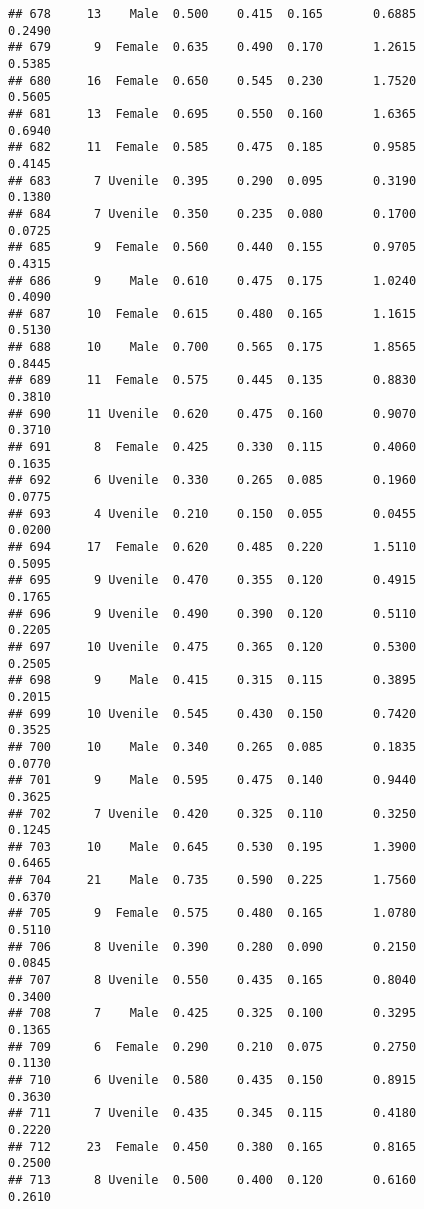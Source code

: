\documentclass[
]{article}
\begin{document}
\begin{verbatim}
## 678     13    Male  0.500    0.415  0.165       0.6885         0.2490
## 679      9  Female  0.635    0.490  0.170       1.2615         0.5385
## 680     16  Female  0.650    0.545  0.230       1.7520         0.5605
## 681     13  Female  0.695    0.550  0.160       1.6365         0.6940
## 682     11  Female  0.585    0.475  0.185       0.9585         0.4145
## 683      7 Uvenile  0.395    0.290  0.095       0.3190         0.1380
## 684      7 Uvenile  0.350    0.235  0.080       0.1700         0.0725
## 685      9  Female  0.560    0.440  0.155       0.9705         0.4315
## 686      9    Male  0.610    0.475  0.175       1.0240         0.4090
## 687     10  Female  0.615    0.480  0.165       1.1615         0.5130
## 688     10    Male  0.700    0.565  0.175       1.8565         0.8445
## 689     11  Female  0.575    0.445  0.135       0.8830         0.3810
## 690     11 Uvenile  0.620    0.475  0.160       0.9070         0.3710
## 691      8  Female  0.425    0.330  0.115       0.4060         0.1635
## 692      6 Uvenile  0.330    0.265  0.085       0.1960         0.0775
## 693      4 Uvenile  0.210    0.150  0.055       0.0455         0.0200
## 694     17  Female  0.620    0.485  0.220       1.5110         0.5095
## 695      9 Uvenile  0.470    0.355  0.120       0.4915         0.1765
## 696      9 Uvenile  0.490    0.390  0.120       0.5110         0.2205
## 697     10 Uvenile  0.475    0.365  0.120       0.5300         0.2505
## 698      9    Male  0.415    0.315  0.115       0.3895         0.2015
## 699     10 Uvenile  0.545    0.430  0.150       0.7420         0.3525
## 700     10    Male  0.340    0.265  0.085       0.1835         0.0770
## 701      9    Male  0.595    0.475  0.140       0.9440         0.3625
## 702      7 Uvenile  0.420    0.325  0.110       0.3250         0.1245
## 703     10    Male  0.645    0.530  0.195       1.3900         0.6465
## 704     21    Male  0.735    0.590  0.225       1.7560         0.6370
## 705      9  Female  0.575    0.480  0.165       1.0780         0.5110
## 706      8 Uvenile  0.390    0.280  0.090       0.2150         0.0845
## 707      8 Uvenile  0.550    0.435  0.165       0.8040         0.3400
## 708      7    Male  0.425    0.325  0.100       0.3295         0.1365
## 709      6  Female  0.290    0.210  0.075       0.2750         0.1130
## 710      6 Uvenile  0.580    0.435  0.150       0.8915         0.3630
## 711      7 Uvenile  0.435    0.345  0.115       0.4180         0.2220
## 712     23  Female  0.450    0.380  0.165       0.8165         0.2500
## 713      8 Uvenile  0.500    0.400  0.120       0.6160         0.2610

\end{verbatim}
\end{document}
